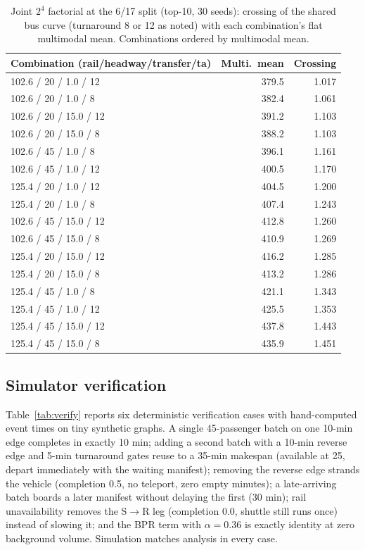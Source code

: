 \documentclass{ieeeaccess}
\begin{document}
\begin{table}[!t]
\caption{Joint $2^4$ factorial at the 6/17 split (top-10, 30 seeds): crossing of the shared bus curve (turnaround 8 or 12 as noted) with each combination's flat multimodal mean. Combinations ordered by multimodal mean.}
\label{tab:joint}
\centering
\footnotesize
\begin{tabular}{@{}lrr@{}}
\hline
Combination (rail/headway/transfer/ta) & Multi.\ mean & Crossing \\
\hline
102.6 / 20 / 1.0 / 12 & 379.5 & 1.017 \\
102.6 / 20 / 1.0 / 8 & 382.4 & 1.061 \\
102.6 / 20 / 15.0 / 12 & 391.2 & 1.103 \\
102.6 / 20 / 15.0 / 8 & 388.2 & 1.103 \\
102.6 / 45 / 1.0 / 8 & 396.1 & 1.161 \\
102.6 / 45 / 1.0 / 12 & 400.5 & 1.170 \\
125.4 / 20 / 1.0 / 12 & 404.5 & 1.200 \\
125.4 / 20 / 1.0 / 8 & 407.4 & 1.243 \\
102.6 / 45 / 15.0 / 12 & 412.8 & 1.260 \\
102.6 / 45 / 15.0 / 8 & 410.9 & 1.269 \\
125.4 / 20 / 15.0 / 12 & 416.2 & 1.285 \\
125.4 / 20 / 15.0 / 8 & 413.2 & 1.286 \\
125.4 / 45 / 1.0 / 8 & 421.1 & 1.343 \\
125.4 / 45 / 1.0 / 12 & 425.5 & 1.353 \\
125.4 / 45 / 15.0 / 12 & 437.8 & 1.443 \\
125.4 / 45 / 15.0 / 8 & 435.9 & 1.451 \\
\hline
\end{tabular}
\end{table}

\subsection{Simulator verification}
Table~\ref{tab:verify} reports six deterministic verification cases with hand-computed event times on tiny synthetic graphs. A single 45-passenger batch on one 10-min edge completes in exactly 10 min; adding a second batch with a 10-min reverse edge and 5-min turnaround gates reuse to a 35-min makespan (available at 25, depart immediately with the waiting manifest); removing the reverse edge strands the vehicle (completion 0.5, no teleport, zero empty minutes); a late-arriving batch boards a later manifest without delaying the first (30 min); rail unavailability removes the S$\rightarrow$R leg (completion 0.0, shuttle still runs once) instead of slowing it; and the BPR term with $\alpha=0.36$ is exactly identity at zero background volume. Simulation matches analysis in every case.
\end{document}
